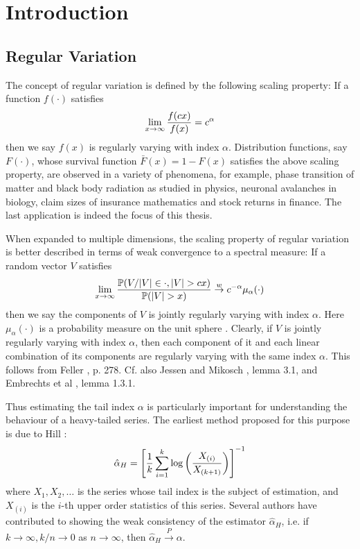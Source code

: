 \chapter{Introduction}\label{ch:intr}


\section{Regular Variation}
The concept of regular variation is defined by the following scaling
property: If a function $f(\cdot)$ satisfies
\[
\lim_{x \to \infty} {f(c x) \over f(x)} = c^\alpha
\]
then we say $f(x)$ is regularly varying with index $\alpha$.
Distribution functions, say $F(\cdot)$, whose survival function
$\bar F(x) = 1 - F(x)$ satisfies the above scaling property, are
observed in a variety of phenomena, for example, phase transition of
matter and black body radiation as studied in physics, neuronal
avalanches in biology, claim sizes of insurance mathematics and stock
returns in finance. The last application is indeed the focus of this
thesis.

When expanded to multiple dimensions, the scaling property of regular
variation is better described in terms of weak convergence to a
spectral measure: If a random vector $V$ satisfies
\[
\lim_{x \to \infty}
{
  \P(V/|V| \in \cdot, |V| > c x)
  \over
  \P(|V| > x)
}
\overset{w}{\to} c^{-\alpha} \mu_\alpha(\cdot)
\]
then we say the components of $V$ is jointly regularly varying with
index $\alpha$. Here $\mu_\alpha(\cdot)$ is a probability measure on
the unit sphere \cite{buraczewski:damek:mikosch:2016}. Clearly, if $V$
is jointly regularly varying with index $\alpha$, then each component
of it and each linear combination of its components are regularly
varying with the same index $\alpha$. This follows from Feller
\cite{feller}, p. 278. Cf. also Jessen and Mikosch
\cite{JessenMikosch2006}, lemma 3.1, and Embrechts et al
\cite{embrechts:klueppelberg:mikosch:1997}, lemma 1.3.1.

Thus estimating the tail index $\alpha$ is particularly important for
understanding the behaviour of a heavy-tailed series. The earliest
method proposed for this purpose is due to Hill \cite{hill1975simple}:
\[
\hat \alpha_H = \left[
  {1 \over k} \sum_{i=1}^k \log \left(
  X_{(i)} \over X_{(k+1)}
  \right)
  \right]^{-1}
\]
where $X_1, X_2, \dots$ is the series whose tail index is the subject
of estimation, and $X_{(i)}$ is the $i$-th upper order statistics of
this series. Several authors have contributed to showing the
weak consistency of the estimator $\hat \alpha_H$,
i.e. if $k \to \infty, k/n \to 0$ as $n \to \infty$, then
$\hat \alpha_H \overset{P}{\to} \alpha$.

